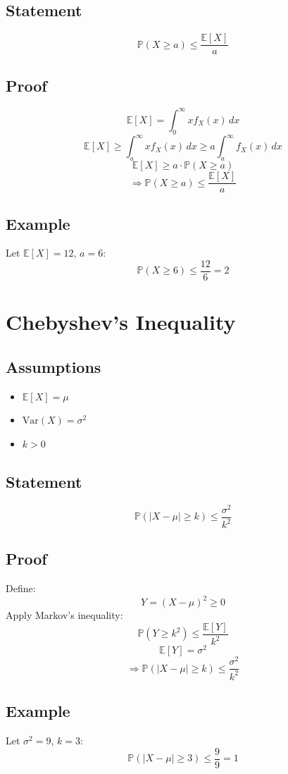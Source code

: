 \documentclass[12pt]{article}
\begin{document}
\subsection{Statement}
\[
\mathbb{P}(X \geq a) \leq \frac{\mathbb{E}[X]}{a}
\]

\subsection{Proof}
\[
\mathbb{E}[X] = \int_0^\infty x f_X(x)\,dx
\]
\[
\mathbb{E}[X] \geq \int_a^\infty x f_X(x)\,dx \geq a \int_a^\infty f_X(x)\,dx
\]
\[
\mathbb{E}[X] \geq a \cdot \mathbb{P}(X \geq a)
\]
\[
\Rightarrow \mathbb{P}(X \geq a) \leq \frac{\mathbb{E}[X]}{a}
\]

\subsection{Example}
Let $\mathbb{E}[X] = 12$, $a = 6$:
\[
\mathbb{P}(X \geq 6) \leq \frac{12}{6} = 2
\]

\section{Chebyshev’s Inequality}

\subsection{Assumptions}
\begin{itemize}
    \item $\mathbb{E}[X] = \mu$
    \item $\text{Var}(X) = \sigma^2$
    \item $k > 0$
\end{itemize}

\subsection{Statement}
\[
\mathbb{P}(|X - \mu| \geq k) \leq \frac{\sigma^2}{k^2}
\]

\subsection{Proof}
Define:
\[
Y = (X - \mu)^2 \geq 0
\]
Apply Markov’s inequality:
\[
\mathbb{P}(Y \geq k^2) \leq \frac{\mathbb{E}[Y]}{k^2}
\]
\[
\mathbb{E}[Y] = \sigma^2
\]
\[
\Rightarrow \mathbb{P}(|X - \mu| \geq k) \leq \frac{\sigma^2}{k^2}
\]

\subsection{Example}
Let $\sigma^2 = 9$, $k = 3$:
\[
\mathbb{P}(|X - \mu| \geq 3) \leq \frac{9}{9} = 1
\]
\end{document}
